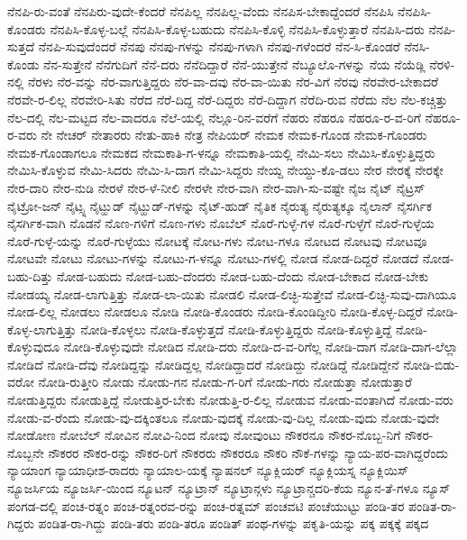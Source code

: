 {ನೆನಪಿ-ರು-ವಂತೆ
ನೆನಪಿರು-ವುದೇ-ಕೆಂದರೆ
ನೆನಪಿಲ್ಲ
ನೆನಪಿಲ್ಲ-ವೆಂದು
ನೆನಪಿಸ-ಬೇಕಾದ್ದೆಂದರೆ
ನೆನಪಿಸಿ
ನೆನಪಿಸಿ-ಕೊಂಡರು
ನೆನಪಿಸಿ-ಕೊಳ್ಳ-ಬಲ್ಲೆ
ನೆನಪಿಸಿ-ಕೊಳ್ಳ-ಬಹುದು
ನೆನಪಿಸಿ-ಕೊಳ್ಳಿ
ನೆನಪಿಸಿ-ಕೊಳ್ಳುತ್ತಾರೆ
ನೆನಪಿಸಿ-ದರು
ನೆನಪಿ-ಸುತ್ತದೆ
ನೆನಪಿ-ಸುವುದೆಂದರೆ
ನೆನಪು
ನೆನಪು-ಗಳನ್ನು
ನೆನಪು-ಗಳಾಗಿ
ನೆನಪು-ಗಳೆಂದರೆ
ನೆನ-ಸಿ-ಕೊಂಡರೆ
ನೆನಸಿ-ಕೊಂಡು
ನೆನ-ಸುತ್ತೇನೆ
ನೆನೆಗುದಿಗೆ
ನೆನೆ-ದರು
ನೆನೆದಿದ್ದಾರೆ
ನೆನೆ-ಯುತ್ತೇನೆ
ನೆಬ್ಯೂಲೊ-ಗಳನ್ನು
ನೆಯ
ನೆಯೆಡ್ಲಿ
ನೆರಳಿ-ನಲ್ಲಿ
ನೆರಳು
ನೆರ-ವನ್ನು
ನೆರ-ವಾಗುತ್ತಿದ್ದರು
ನೆರ-ವಾ-ದವು
ನೆರ-ವಾ-ಯಿತು
ನೆರ-ವಿಗೆ
ನೆರವು
ನೆರವೇರ-ಬೇಕಾದರೆ
ನೆರವೇ-ರ-ಲಿಲ್ಲ
ನೆರವೇರಿ-ಸಿತು
ನೆರೆದ
ನೆರೆ-ದಿದ್ದ
ನೆರೆ-ದಿದ್ದರು
ನೆರೆ-ದಿದ್ದಾಗ
ನೆರೆದಿ-ರುವ
ನೆರೆದು
ನೆಲ
ನೆಲ-ಕಚ್ಚಿತ್ತು
ನೆಲ-ದಲ್ಲಿ
ನೆಲ-ಮಟ್ಟದ
ನೆಲ-ವಾದರೂ
ನೆಲೆ-ಯಲ್ಲಿ
ನೆಲ್ಲೂ-ರಿನ-ವರೆಗೆ
ನೆಹರು
ನೆಹರೂ
ನೆಹರೂ-ರ-ವ-ರಿಗೆ
ನೆಹರೂ-ರ-ವರು
ನೇ
ನೇಚರ್
ನೇತಾರರು
ನೇತು-ಹಾಕಿ
ನೇತ್ರ
ನೇಪಿಯರ್
ನೇಮಕ
ನೇಮಕ-ಗೊಂಡ
ನೇಮಕ-ಗೊಂಡರು
ನೇಮಕ-ಗೊಂಡಾಗಲೂ
ನೇಮಕದ
ನೇಮಕಾತಿ-ಗ-ಳನ್ನೂ
ನೇಮಕಾತಿ-ಯಲ್ಲಿ
ನೇಮಿ-ಸಲು
ನೇಮಿಸಿ-ಕೊಳ್ಳುತ್ತಿದ್ದರು
ನೇಮಿಸಿ-ಕೊಳ್ಳುವ
ನೇಮಿ-ಸಿದರು
ನೇಮಿ-ಸಿ-ದಾಗ
ನೇಮಿ-ಸಿದ್ದರು
ನೇಯ್ದ
ನೇಯ್ದು-ಕೊ-ಡಲು
ನೇರ
ನೇರಕ್ಕೆ
ನೇರಕ್ಕೇ
ನೇರ-ದಾರಿ
ನೇರ-ನುಡಿ
ನೇರಳೆ
ನೇರ-ಳೆ-ನೀಲಿ
ನೇರಳೇ
ನೇರ-ವಾಗಿ
ನೇರ-ವಾಗಿ-ಸು-ವಷ್ಟೇ
ನೈಜ
ನೈಟ್
ನೈಟ್ರಸ್
ನೈಟ್ರೋ-ಜನ್
ನೈಟ್ಸ್ನ
ನೈಟ್ಹುಡ್
ನೈಟ್ಹುಡ್-ಗಳನ್ನು
ನೈಟ್-ಹುಡ್
ನೈತಿಕ
ನೈರುತ್ಯ
ನೈರುತ್ಯಕ್ಕೂ
ನೈಲಾನ್
ನೈಸರ್ಗಿಕ
ನೈಸರ್ಗಿಕ-ವಾಗಿ
ನೊಡನೆ
ನೊಣ-ಗಳಿಗೆ
ನೊಣ-ಗಳು
ನೊಬೆಲ್
ನೊರೆ-ಗುಳ್ಳೆ-ಗಳ
ನೊರೆ-ಗುಳ್ಳೆಗೆ
ನೊರೆ-ಗುಳ್ಳೆಯ
ನೊರೆ-ಗುಳ್ಳೆ-ಯನ್ನು
ನೊರೆ-ಗುಳ್ಳೆಯು
ನೋಟಕ್ಕೆ
ನೋಟ-ಗಳು
ನೋಟ-ಗಳೂ
ನೋಟದ
ನೋಟವು
ನೋಟವೂ
ನೋಟವೇ
ನೋಟು
ನೋಟು-ಗಳನ್ನು
ನೋಟು-ಗ-ಳನ್ನೂ
ನೋಟು-ಗಳಲ್ಲಿ
ನೋಡ
ನೋಡ-ದಿದ್ದರೆ
ನೋಡದೆ
ನೋಡ-ಬಹು-ದಿತ್ತು
ನೋಡ-ಬಹುದು
ನೋಡ-ಬಹು-ದೆಂದರು
ನೋಡ-ಬಹು-ದೆಂದು
ನೋಡ-ಬೇಕಾದ
ನೋಡ-ಬೇಕು
ನೋಡಯ್ಯ
ನೋಡ-ಲಾಗುತ್ತಿತ್ತು
ನೋಡ-ಲಾ-ಯಿತು
ನೋಡಲಿ
ನೋಡ-ಲಿಚ್ಛಿ-ಸುತ್ತೇವೆ
ನೋಡ-ಲಿಚ್ಛಿ-ಸುವು-ದಾಗಿಯೂ
ನೋಡ-ಲಿಲ್ಲ
ನೋಡಲು
ನೋಡಲೂ
ನೋಡಿ
ನೋಡಿ-ಕೊಂಡರು
ನೋಡಿ-ಕೊಂಡಿದ್ದೀರಿ
ನೋಡಿ-ಕೊಳ್ಳ-ದಿದ್ದರೆ
ನೋಡಿ-ಕೊಳ್ಳ-ಲಾಗುತ್ತಿತ್ತು
ನೋಡಿ-ಕೊಳ್ಳಲು
ನೋಡಿ-ಕೊಳ್ಳುತ್ತದೆ
ನೋಡಿ-ಕೊಳ್ಳುತ್ತಿದ್ದರು
ನೋಡಿ-ಕೊಳ್ಳುತ್ತಿದ್ದೆ
ನೋಡಿ-ಕೊಳ್ಳುವುದೂ
ನೋಡಿ-ಕೊಳ್ಳುವುದೇ
ನೋಡಿದ
ನೋಡಿ-ದರು
ನೋಡಿ-ದ-ವ-ರಿಗೆಲ್ಲ
ನೋಡಿ-ದಾಗ
ನೋಡಿ-ದಾಗ-ಲೆಲ್ಲಾ
ನೋಡಿದೆ
ನೋಡಿ-ದೆವು
ನೋಡಿದ್ದನ್ನು
ನೋಡಿದ್ದಲ್ಲ
ನೋಡಿದ್ದಾದರೆ
ನೋಡಿದ್ದು
ನೋಡಿದ್ದೆ
ನೋಡಿದ್ದೇನೆ
ನೋಡಿ-ಬಿಡು-ವರೋ
ನೋಡಿ-ರುತ್ತೀರಿ
ನೋಡು
ನೋಡು-ಗನ
ನೋಡು-ಗ-ರಿಗೆ
ನೋಡು-ಗರು
ನೋಡುತ್ತಾ
ನೋಡುತ್ತಾರೆ
ನೋಡುತ್ತಿದ್ದರು
ನೋಡುತ್ತಿದ್ದೆ
ನೋಡುತ್ತಿರ-ಬೇಕು
ನೋಡುತ್ತಿ-ರ-ಲಿಲ್ಲ
ನೋಡುವ
ನೋಡು-ವಂತಾಗಿದೆ
ನೋಡು-ವರು
ನೋಡು-ವ-ರೆಂದು
ನೋಡು-ವು-ದಕ್ಕಿಂತಲೂ
ನೋಡು-ವುದಕ್ಕೆ
ನೋಡು-ವು-ದಿಲ್ಲ
ನೋಡು-ವುದು
ನೋಡು-ವುದೇ
ನೋಡೋಣ
ನೋಬೆಲ್
ನೋವಿನ
ನೋವಿ-ನಿಂದ
ನೋವು
ನೋವುಂಟು
ನೌಕರನೂ
ನೌಕರ-ನೊಬ್ಬ-ನಿಗೆ
ನೌಕರ-ನೊಬ್ಬನೇ
ನೌಕರರ
ನೌಕರ-ರನ್ನು
ನೌಕರ-ರಿಗೆ
ನೌಕರರು
ನೌಕರರೂ
ನೌಕರಿ
ನೌಕೆ-ಗಳನ್ನು
ನ್ಯಾಯ-ಪರ-ವಾಗಿದ್ದರೆಂದು
ನ್ಯಾಯಾಂಗ
ನ್ಯಾಯಾಧೀಶ-ರಾದರು
ನ್ಯಾಯಾಲ-ಯಕ್ಕೆ
ನ್ಯಾಷನಲ್
ನ್ಯೂಕ್ಲಿಯರ್
ನ್ಯೂಕ್ಲಿಯಸ್ನ
ನ್ಯೂಕ್ಲಿಯಿಸ್
ನ್ಯೂಜರ್ಸಿಯ
ನ್ಯೂಜರ್ಸಿ-ಯಿಂದ
ನ್ಯೂಟನ್
ನ್ಯೂಟ್ರಾನ್
ನ್ಯೂಟ್ರಾನ್ಗಳು
ನ್ಯೂಟ್ರಾನ್ಚದರಿ-ಕೆಯ
ನ್ಯೂನ-ತೆ-ಗಳೂ
ನ್ಯೂಸ್
ಪಂಗಡ-ದಲ್ಲಿ
ಪಂಚ-ರತ್ನಂ
ಪಂಚ-ರತ್ನಂರವ-ರನ್ನು
ಪಂಚ-ರತ್ನಮ್
ಪಂಚವಟಿ
ಪಂಚೆಯುಟ್ಟು
ಪಂಡಿ-ತರ
ಪಂಡಿತ-ರಾ-ಗಿದ್ದರು
ಪಂಡಿತ-ರಾ-ಗಿದ್ದು
ಪಂಡಿ-ತರು
ಪಂಡಿ-ತರೂ
ಪಂಡಿತ್
ಪಂಥ-ಗಳನ್ನು
ಪಕೃತಿ-ಯನ್ನು
ಪಕ್ಕ
ಪಕ್ಕಕ್ಕೆ
ಪಕ್ಕದ
}
